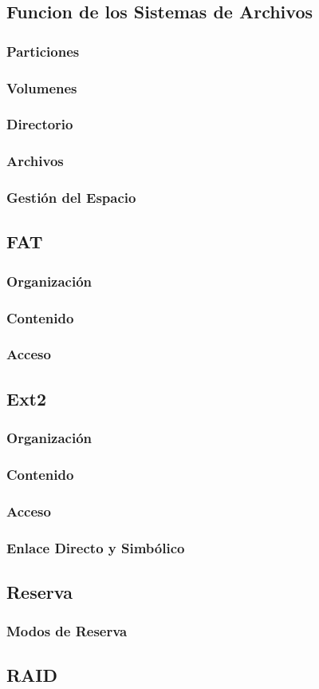 \subsection{Funcion de los Sistemas de Archivos}
\subsubsection{Particiones}
\subsubsection{Volumenes}
\subsubsection{Directorio}
\subsubsection{Archivos}
\subsubsection{Gestión del Espacio}
\subsection{FAT}
\subsubsection{Organización}
\subsubsection{Contenido}
\subsubsection{Acceso}
\subsection{Ext2}
\subsubsection{Organización}
\subsubsection{Contenido}
\subsubsection{Acceso}
\subsubsection{Enlace Directo y Simbólico}
\subsection{Reserva}
\subsubsection{Modos de Reserva}
\subsection{RAID}